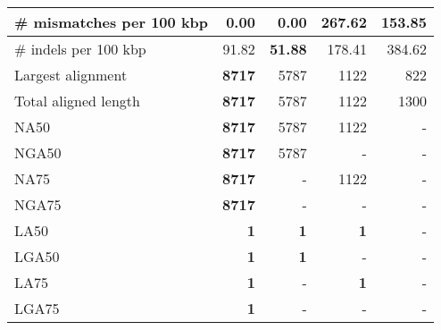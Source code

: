\documentclass[12pt,a4paper]{article}
\begin{document}
\begin{table}[ht]
\begin{center}
\begin{tabular}{|l*{4}{|r}|}
\# mismatches per 100 kbp & {\bf 0.00} & {\bf 0.00} & 267.62 & 153.85 \\ \hline
\# indels per 100 kbp & 91.82 & {\bf 51.88} & 178.41 & 384.62 \\ \hline
Largest alignment & {\bf 8717} & 5787 & 1122 & 822 \\ \hline
Total aligned length & {\bf 8717} & 5787 & 1122 & 1300 \\ \hline
NA50 & {\bf 8717} & 5787 & 1122 & - \\ \hline
NGA50 & {\bf 8717} & 5787 & - & - \\ \hline
NA75 & {\bf 8717} & - & 1122 & - \\ \hline
NGA75 & {\bf 8717} & - & - & - \\ \hline
LA50 & {\bf 1} & {\bf 1} & {\bf 1} & - \\ \hline
LGA50 & {\bf 1} & {\bf 1} & - & - \\ \hline
LA75 & {\bf 1} & - & {\bf 1} & - \\ \hline
LGA75 & {\bf 1} & - & - & - \\ \hline
\end{tabular}
\end{center}
\end{table}
\end{document}
